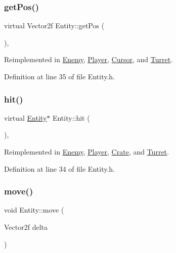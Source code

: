 \subsubsection{\texorpdfstring{get\+Pos()}{getPos()}}
{\footnotesize\ttfamily virtual Vector2f Entity\+::get\+Pos (\begin{DoxyParamCaption}{ }\end{DoxyParamCaption})\hspace{0.3cm}{\ttfamily [inline]}, {\ttfamily [virtual]}}



Reimplemented in \hyperlink{class_enemy_a65af045027f5fd7396b420f0d4c34dac}{Enemy}, \hyperlink{class_player_a59cfaac9d09b12a290d2e89ca656be49}{Player}, \hyperlink{class_cursor_a214e135fad5e686f5bcfea34806c8730}{Cursor}, and \hyperlink{class_turret_a706e5a6001c3a0213b7510d4b99c0768}{Turret}.



Definition at line 35 of file Entity.\+h.

\mbox{\label{class_entity_a29117f3f40e7069d5d4c1b2fca7819d6}} 
\subsubsection{\texorpdfstring{hit()}{hit()}}
{\footnotesize\ttfamily virtual \hyperlink{class_entity}{Entity}$\ast$ Entity\+::hit (\begin{DoxyParamCaption}{ }\end{DoxyParamCaption})\hspace{0.3cm}{\ttfamily [inline]}, {\ttfamily [virtual]}}



Reimplemented in \hyperlink{class_enemy_a6cb8f8dbec88de9b2e95643709e349a3}{Enemy}, \hyperlink{class_player_a089d9293cc3be7e5d6d7c89b49538134}{Player}, \hyperlink{class_crate_a6e4a24b12c92e8576c107b60f0b8f1a8}{Crate}, and \hyperlink{class_turret_a141f76a3821b1d08a5aec057506c86e7}{Turret}.



Definition at line 34 of file Entity.\+h.

\mbox{\label{class_entity_a1d077cd5a6aa78265e4d9888cfc39d2c}} 
\subsubsection{\texorpdfstring{move()}{move()}}
{\footnotesize\ttfamily void Entity\+::move (\begin{DoxyParamCaption}\item[{Vector2f}]{delta }\end{DoxyParamCaption})}




